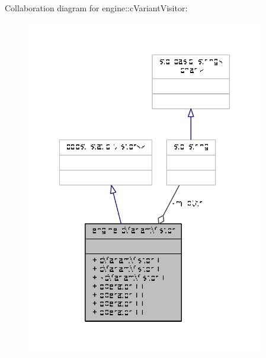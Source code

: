 Collaboration diagram for engine\-:\-:c\-Variant\-Visitor\-:
\nopagebreak
\begin{figure}[H]
\begin{center}
\leavevmode
\includegraphics[width=295pt]{classengine_1_1cVariantVisitor__coll__graph}
\end{center}
\end{figure}
